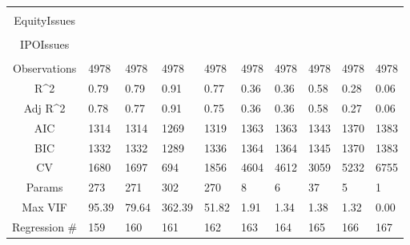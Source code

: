 \documentclass{article}
\begin{document}
\begin{table}[H]
\begin{tabular}{|clllllllll|}
   &  &  &  &  &  &  &  &  &  \\ 
  EquityIssues &  &  &  &  &  &  &  &  &  \\ 
   &  &  &  &  &  &  &  &  &  \\ 
  IPOIssues &  &  &  &  &  &  &  &  &  \\ 
   &  &  &  &  &  &  &  &  &  \\ 
  \hline 
 Observations & 4978 & 4978 & 4978 & 4978 & 4978 & 4978 & 4978 & 4978 & 4978 \\ 
  R^2 & 0.79 & 0.79 & 0.91 & 0.77 & 0.36 & 0.36 & 0.58 & 0.28 & 0.06 \\ 
  Adj R^2 & 0.78 & 0.77 & 0.91 & 0.75 & 0.36 & 0.36 & 0.58 & 0.27 & 0.06 \\ 
  AIC & 1314 & 1314 & 1269 & 1319 & 1363 & 1363 & 1343 & 1370 & 1383 \\ 
  BIC & 1332 & 1332 & 1289 & 1336 & 1364 & 1364 & 1345 & 1370 & 1383 \\ 
  CV & 1680 & 1697 & 694 & 1856 & 4604 & 4612 & 3059 & 5232 & 6755 \\ 
  Params & 273 & 271 & 302 & 270 & 8 & 6 & 37 & 5 & 1 \\ 
  Max VIF & 95.39 & 79.64 & 362.39 & 51.82 & 1.91 & 1.34 & 1.38 & 1.32 & 0.00 \\ 
  Regression \# & 159 & 160 & 161 & 162 & 163 & 164 & 165 & 166 & 167 \\ 
   \hline
\end{tabular}
 
\end{table}
\end{document}

